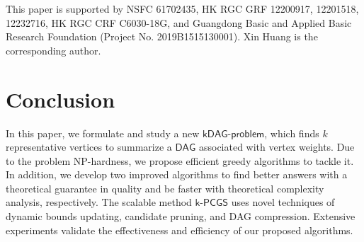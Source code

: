 \documentclass[sigconf]{acmart}
\newcommand{\kw}[1]{{\ensuremath {\mathsf{#1}}}\xspace}
\newcommand{\stitle}[1]{\vspace{1ex} \noindent{\bf #1}}
\newcommand{\kdag}{\kw{kDAG}-\kw{problem}}
\newcommand{\DAG}{\kw{DAG}}
\newcommand{\DAGs}{\kw{DAGs}}
\newcommand{\vdag}{\kw{k}-\kw{PCGS}}
\begin{document}
\maketitle






 
% 
 



\stitle{Acknowledgement.} This paper is supported by NSFC 61702435, HK RGC GRF 12200917, 12201518, 12232716, HK RGC CRF  C6030-18G, and Guangdong Basic and Applied Basic Research Foundation (Project No. 2019B1515130001). Xin Huang is the corresponding author.

\section{Conclusion}\label{sec.conclusion}
In this paper, we formulate and study a new \kdag,
which finds 
$k$ representative vertices to summarize a  \DAG associated with vertex weights. Due to the problem NP-hardness, we propose efficient greedy algorithms to tackle it. 
In addition, we develop two improved algorithms to find better answers with a theoretical guarantee in quality and be faster with theoretical complexity analysis, respectively. The scalable method \vdag uses novel techniques of dynamic bounds updating, candidate pruning, and DAG compression. 
Extensive experiments 
validate the effectiveness and efficiency of our proposed algorithms.

\balance

% 


\end{document}
